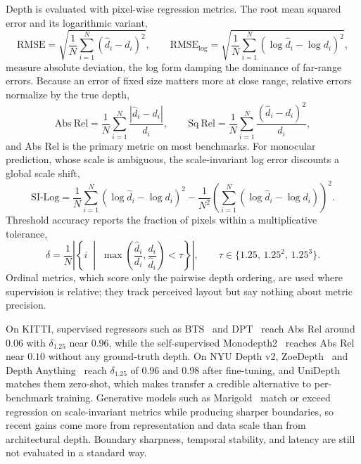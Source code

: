 Depth is evaluated with pixel-wise regression metrics. The root mean squared error and its logarithmic variant,
\begin{equation}
\mathrm{RMSE} = \sqrt{ \frac{1}{N} \sum_{i=1}^{N} \left( \hat{d}_i - d_i \right)^2 }, \qquad
\mathrm{RMSE}_{\log} = \sqrt{ \frac{1}{N} \sum_{i=1}^{N} \left( \log \hat{d}_i - \log d_i \right)^2 },
\end{equation}
measure absolute deviation, the log form damping the dominance of far-range errors. Because an error of fixed size matters more at close range, relative errors normalize by the true depth,
\begin{equation}
\mathrm{Abs\ Rel} = \frac{1}{N} \sum_{i=1}^{N} \frac{ \left| \hat{d}_i - d_i \right| }{ d_i }, \qquad
\mathrm{Sq\ Rel} = \frac{1}{N} \sum_{i=1}^{N} \frac{ \left( \hat{d}_i - d_i \right)^2 }{ d_i },
\end{equation}
and Abs Rel is the primary metric on most benchmarks. For monocular prediction, whose scale is ambiguous, the scale-invariant log error discounts a global scale shift,
\begin{equation}
\mathrm{SI\text{-}Log} =
\frac{1}{N} \sum_{i=1}^{N} \left( \log \hat{d}_i - \log d_i \right)^2
-
\frac{1}{N^2} \left( \sum_{i=1}^{N} \left( \log \hat{d}_i - \log d_i \right) \right)^2 .
\end{equation}
Threshold accuracy reports the fraction of pixels within a multiplicative tolerance,
\begin{equation}
\delta =
\frac{1}{N}
\left|
\left\{
i \;\middle|\;
\max\!\left(
\frac{\hat{d}_i}{d_i},
\frac{d_i}{\hat{d}_i}
\right)
< \tau
\right\}
\right|, \qquad \tau \in \{1.25,\, 1.25^2,\, 1.25^3\}.
\end{equation}
Ordinal metrics, which score only the pairwise depth ordering, are used where supervision is relative; they track perceived layout but say nothing about metric precision.

On KITTI, supervised regressors such as BTS~\cite{lee2019big} and DPT~\cite{dpt} reach Abs Rel around $0.06$ with $\delta_{1.25}$ near $0.96$, while the self-supervised Monodepth2~\cite{godard2019digging} reaches Abs Rel near $0.10$ without any ground-truth depth. On NYU Depth v2, ZoeDepth~\cite{zoedepth} and Depth Anything~\cite{DepthAnything} reach $\delta_{1.25}$ of $0.96$ and $0.98$ after fine-tuning, and UniDepth~\cite{UniDepth} matches them zero-shot, which makes transfer a credible alternative to per-benchmark training. Generative models such as Marigold~\cite{ke2024repurposing} match or exceed regression on scale-invariant metrics while producing sharper boundaries, so recent gains come more from representation and data scale than from architectural depth. Boundary sharpness, temporal stability, and latency are still not evaluated in a standard way.

